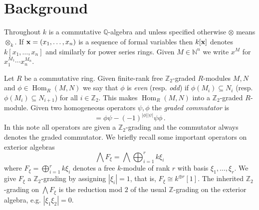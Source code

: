 \documentclass[english,letter paper,12pt,leqno]{article}
\theoremstyle{example}
\newtheorem{remark}[theorem]{Remark}
\numberwithin{equation}{section}
\def\stab{\operatorname{stab}}
\def\Hom{\operatorname{Hom}}
\def\be{\begin{equation}}
\def\ee{\end{equation}}
\def\nZ{\mathds{Z}}
\begin{document}
\begin{itemize}
\end{itemize}



\section{Background}

Throughout $k$ is a commutative $\mathbb{Q}$-algebra and unless specified otherwise $\otimes$ means $\otimes_k$. If $\bold{x} = (x_1,\ldots,x_n)$ is a sequence of formal variables then $k[\bold{x}]$ denotes $k[x_1,\ldots,x_n]$ and similarly for power series rings. Given $M \in \mathbb{N}^n$ we write $x^M$ for $x_1^{M_1} \cdots x_n^{M_n}$. 

Let $R$ be a commutative ring. Given finite-rank free $\nZ_2$-graded $R$-modules $M, N$ and $\phi \in \Hom_R(M,N)$ we say that $\phi$ is \emph{even} (resp. \emph{odd}) if $\phi(M_i) \subseteq N_i$ (resp. $\phi(M_i) \subseteq N_{i+1}$) for all $i \in \nZ_2$. This makes $\Hom_R(M,N)$ into a $\nZ_2$-graded $R$-module. Given two homogeneous operators $\psi, \phi$ the \emph{graded commutator} is
\be
[\phi, \psi] = \phi \psi - (-1)^{|\phi||\psi|} \psi \phi\,.
\ee
In this note all operators are given a $\nZ_2$-grading and the commutator always denotes the graded commutator. We briefly recall some important operators on exterior algebras
\[
\bigwedge F_\xi = \bigwedge \bigoplus_{i=1}^r k \xi_i
\]
where $F_\xi = \bigoplus_{i=1}^r k \xi_i$ denotes a free $k$-module of rank $r$ with basis $\xi_1,\ldots,\xi_r$. We give $F_\xi$ a $\nZ_2$-grading by assigning $|\xi_i| = 1$, that is, $F_\xi \cong k^{\oplus r}[1]$. The inherited $\nZ_2$-grading on $\bigwedge F_\xi$ is the reduction mod $2$ of the usual $\nZ$-grading on the exterior algebra, e.g. $|\xi_1 \xi_2| = 0$.
\end{document}

